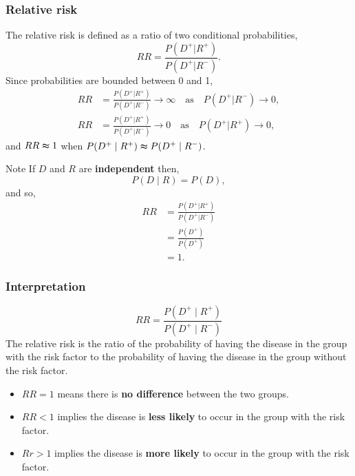 \documentclass[a4paper]{article}\usepackage[]{graphicx}\usepackage[]{xcolor}
\begin{document}
\subsubsection{Relative risk}
The relative risk is defined as a ratio of two conditional probabilities,
\[
	RR = \frac{P(D^+|R^+)}{P(D^+|R^-)}.
\]
Since probabilities are bounded between 0 and 1,
\begin{align*}
	RR &= \frac{P(D^+|R^+)}{P(D^+|R^-)} \to \infty \quad \text{as} \quad P(D^+|R^-) \to 0,\\
	RR &= \frac{P(D^+|R^+)}{P(D^+|R^-)} \to 0 \quad \text{as} \quad P(D^+|R^+) \to 0,
\end{align*}
and \( RR \thickapprox 1 \) when \( P(D^+ \mid R^+) \thickapprox P(D^+ \mid R^-) \).
\begin{bluebox}{Note}
	If \( D \) and \( R \) are \textbf{independent} then,
	\[
		P(D \mid R) = P(D),
	\]
	and so,
	\begin{align*}
		RR & = \frac{P(D^+|R^+)}{P(D^+|R^-)} \\
		& = \frac{P(D^+)}{P(D^+)} \\
		& = 1.
		\end{align*}
	\end{bluebox}
\subsubsection{Interpretation}
\[
	RR = \frac{P(D^+ \mid R^+)}{P(D^+ \mid R^-)}
\]
The relative risk is the ratio of the probability of having the disease in the group with the risk factor to the probability of having the disease in the group without the risk factor.
\begin{itemize}
	\item \( RR = 1 \) means there is \textbf{no difference} between the two groups.
	\item \( RR < 1 \) implies the disease is \textbf{less likely} to occur in the group with the risk factor.
	\item \( Rr > 1 \) implies the disease is \textbf{more likely} to occur in the group with the risk factor.
\end{itemize}
\end{document}
